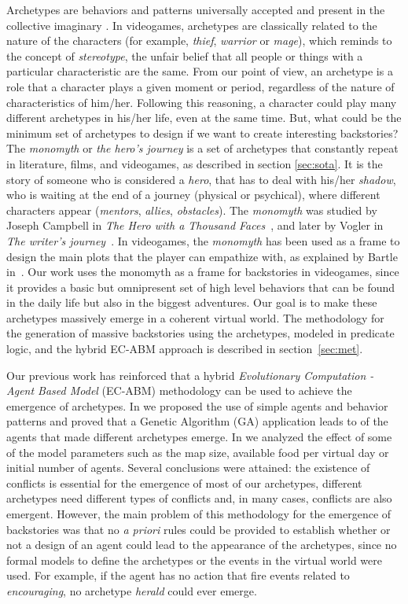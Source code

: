 \documentclass[conference]{IEEEtran}
\begin{document}
Archetypes are behaviors and patterns universally accepted and present in the
collective imaginary \cite{garry2005archetypes}. In videogames, archetypes are classically related to the nature of the characters (for example, \textit{thief}, \textit{warrior} or \textit{mage}), which reminds to the concept of \textit{stereotype}, the unfair belief that all people or things with a particular characteristic are the same. From our point of view, an archetype is a role that a character plays a given moment or period, regardless of the nature of characteristics of him/her. Following this reasoning, a character could play many different archetypes in his/her life, even at the same time. But, what could be the minimum set of archetypes to design if we want to create interesting backstories? The \textit{monomyth} or \textit{the hero's journey} is a set of archetypes that constantly repeat in literature, films, and videogames, as described in section \ref{sec:sota}. It is the story of someone who is considered a \textit{hero}, that has to deal with his/her \textit{shadow}, who is waiting at the end of a journey (physical or psychical), where different characters appear (\textit{mentors}, \textit{allies}, \textit{obstacles}). The \textit{monomyth} was studied by Joseph Campbell in \textit{The Hero with a Thousand Faces}~\cite{joseph1949hero}, and later by Vogler in \textit{The writer's journey}~\cite{vogler2007writer}. In videogames, the \textit{monomyth} has been used as a frame to design the main plots that the player can empathize with, as explained by Bartle in~\cite{bartle2004multihero}. Our work uses the monomyth as a frame for backstories in videogames, since it provides a basic but omnipresent set of high level behaviors that can be found in the daily life but also in the biggest adventures. Our goal is to make these archetypes massively emerge in a coherent virtual world. The methodology for the generation of massive backstories using the archetypes, modeled in predicate logic, and the hybrid EC-ABM approach is described in section~\ref{sec:met}. 

Our previous work has reinforced that a hybrid \textit{Evolutionary
  Computation - Agent Based Model} (EC-ABM) methodology can be used to
achieve the emergence of archetypes. In \cite{garcia14my} we proposed
the use of simple agents and behavior patterns and proved that a
Genetic Algorithm (GA) application leads to of the agents that
made different archetypes emerge. In \cite{garcia2015world} we
analyzed the effect of some of the model parameters such as
the map size, available food per virtual day or initial number of
agents.
Several conclusions were attained: the existence of conflicts is essential for the emergence of most of our archetypes, different archetypes need different types of conflicts and, in many cases, conflicts are also emergent.
However, the main problem of this methodology for the emergence of
backstories was that no {\em a priori} rules
could be provided to establish whether or not a design of an agent
could lead to the appearance of the archetypes, since no formal models to define the archetypes or the events in the virtual world were used. For example, if the agent has no action that fire events related to \textit{encouraging}, no archetype \textit{herald} could ever emerge.
\end{document}
